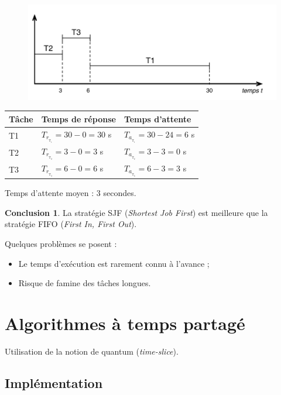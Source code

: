 \documentclass[11pt,english,french]{scrreprt}
\theoremstyle{remark}
\theoremstyle{definition}
\newtheorem*{ccl*}{Conclusion}
\begin{document}
\begin{figure}[h!]
	\center
	\includegraphics[scale=.65]{img/diagramme-gantt-batch-sjn}
\end{figure}

\begin{tabularx}{\linewidth}{lXX}
	\toprule
	Tâche & Temps de réponse & Temps d'attente\tabularnewline
	\midrule
	\midrule
	T1 & $T_{r_{_{\mathrm{T}_{1}}}} = 30-0=30$ s & $T_{a_{_{\mathrm{T}_{1}}}} = 30-24=6$ s\tabularnewline
	\midrule
	T2 & $T_{r_{_{\mathrm{T}_{2}}}} = 3-0=3$ s & $T_{a_{_{\mathrm{T}_{2}}}} = 3-3=0$ s\tabularnewline
	\midrule
	T3 & $T_{r_{_{\mathrm{T}_{3}}}} = 6-0=6$ s & $T_{a_{_{\mathrm{T}_{3}}}} = 6-3=3$ s\tabularnewline
	\bottomrule
\end{tabularx}

Temps d'attente moyen : 3 secondes.

\begin{ccl*}
	La stratégie SJF (\emph{Shortest Job First}) est meilleure que la stratégie FIFO (\emph{First In, First Out}).
	
	Quelques problèmes se posent :\begin{itemize}
		\item Le temps d'exécution est rarement connu à l'avance ;
		\item Risque de famine des tâches longues.
	\end{itemize}
\end{ccl*}

\section{Algorithmes à temps partagé} %

Utilisation de la notion de quantum (\emph{time-slice}).

\subsection{Implémentation} %
\end{document}
